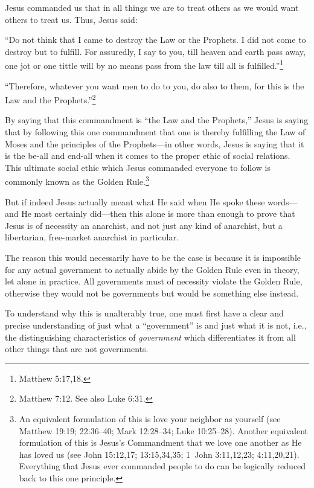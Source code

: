 \documentclass[letterpaper,12pt]{article}
\newenvironment{squote}
  {\small\quote}
  {\endquote\normalsize}
\begin{document}
Jesus commanded us that in all things we are to treat others as we would want others to treat us. Thus, Jesus said:

\begin{squote}
``Do not think that I came to destroy the Law or the Prophets. I did not come to destroy but to fulfill. For assuredly, I say to you, till heaven and earth pass away, one jot or one tittle will by no means pass from the law till all is fulfilled.''\footnote{Matthew 5:17,18.}
\end{squote}

\begin{squote}
``Therefore, whatever you want men to do to you, do also to them, for this is the Law and the Prophets.''\footnote{Matthew 7:12. See also Luke 6:31.}
\end{squote}

By saying that this commandment is ``the Law and the Prophets,'' Jesus is saying that by following this one commandment that one is thereby fulfilling the Law of Moses and the principles of the Prophets---in other words, Jesus is saying that it is the be-all and end-all when it comes to the proper ethic of social relations. This ultimate social ethic which Jesus commanded everyone to follow is commonly known as the Golden Rule.\footnote{An equivalent formulation of this is love your neighbor as yourself (see Matthew 19:19; 22:36--40; Mark 12:28--34; Luke 10:25--28). Another equivalent formulation of this is Jesus's Commandment that we love one another as He has loved us (see John 15:12,17; 13:15,34,35; 1~John 3:11,12,23; 4:11,20,21). Everything that Jesus ever commanded people to do can be logically reduced back to this one principle.}

But if indeed Jesus actually meant what He said when He spoke these words---and He most certainly did---then this alone is more than enough to prove that Jesus is of necessity an anarchist, and not just any kind of anarchist, but a libertarian, free-market anarchist in particular.

The reason this would necessarily have to be the case is because it is impossible for any actual government to actually abide by the Golden Rule even in theory, let alone in practice. All governments must of necessity violate the Golden Rule, otherwise they would not be governments but would be something else instead.

To understand why this is unalterably true, one must first have a clear and precise understanding of just what a ``government'' is and just what it is not, i.e., the distinguishing characteristics of \emph{government} which differentiates it from all other things that are not governments.
\end{document}
